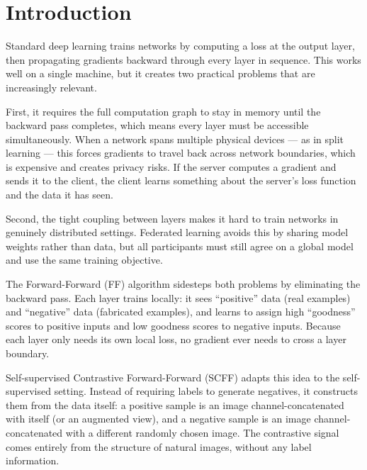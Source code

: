 \documentclass[12pt]{article}
\begin{document}
\tableofcontents
\newpage

\section{Introduction}
\label{sec:intro}

Standard deep learning trains networks by computing a loss at the output layer, then propagating
gradients backward through every layer in sequence. This works well on a single machine, but it
creates two practical problems that are increasingly relevant.

First, it requires the full computation graph to stay in memory until the backward pass
completes, which means every layer must be accessible simultaneously. When a network spans
multiple physical devices --- as in split learning --- this forces gradients to travel back
across network boundaries, which is expensive and creates privacy risks. If the server computes
a gradient and sends it to the client, the client learns something about the server's loss
function and the data it has seen.

Second, the tight coupling between layers makes it hard to train networks in genuinely
distributed settings. Federated learning \citep{mcmahan2017fedavg} avoids this by sharing model
weights rather than data, but all participants must still agree on a global model and use the
same training objective.

The Forward-Forward (FF) algorithm \citep{hinton2022forward} sidesteps both problems by
eliminating the backward pass. Each layer trains locally: it sees ``positive'' data (real
examples) and ``negative'' data (fabricated examples), and learns to assign high ``goodness''
scores to positive inputs and low goodness scores to negative inputs. Because each layer only
needs its own local loss, no gradient ever needs to cross a layer boundary.

Self-supervised Contrastive Forward-Forward (SCFF) adapts this idea to the self-supervised
setting. Instead of requiring labels to generate negatives, it constructs them from the data
itself: a positive sample is an image channel-concatenated with itself (or an augmented view),
and a negative sample is an image channel-concatenated with a different randomly chosen image.
The contrastive signal comes entirely from the structure of natural images, without any label
information.
\end{document}
